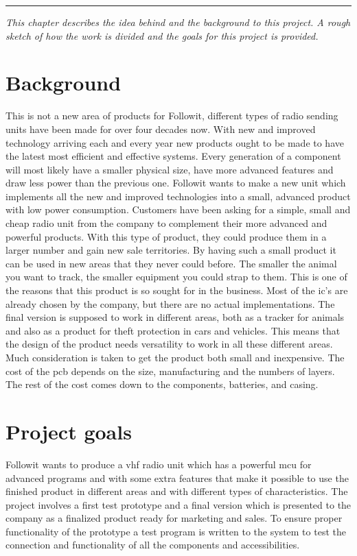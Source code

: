 
\vspace{-10ex}%
\rule{\textwidth}{0.3pt}
\vspace{5ex}

\textit{ 
This chapter describes the idea behind and the background to this project. A rough sketch of how the work is divided and the goals for this project is provided.
}
\vspace{5ex}

\section{Background}	%
This is not a new area of products for Followit, different types of radio sending units have been made for over four decades now. 
With new and improved technology arriving each and every year new products ought to be made to have the latest most efficient and effective systems. Every generation of a component will most likely have a smaller physical size, have more advanced features and draw less power than the previous one. Followit wants to make a new unit which implements all the new and improved technologies into a small, advanced product with low power consumption. 
Customers have been asking for a simple, small and cheap radio unit from the company to complement their more advanced and powerful products. With this type of product, they could produce them in a larger number and gain new sale territories. By having such a small product it can be used in new areas that they never could before. The smaller the animal you want to track, the smaller equipment you could strap to them. This is one of the reasons that this product is so sought for in the business. 
\newline 
Most of the \gls{ic}'s are already chosen by the company, but there are no actual implementations. The final version is supposed to work in different areas, both as a tracker for animals and also as a product for theft protection in cars and vehicles. This means that the design of the product needs versatility to work in all these different areas.  
Much consideration is taken to get the product both small and inexpensive. The cost of the \gls{pcb} depends on the size, manufacturing and the numbers of layers. The rest of the cost comes down to the components, batteries, and casing.    \\


\section{Project goals}	%
Followit wants to produce a \gls{vhf} radio unit which has a powerful \gls{mcu} for advanced programs and with some extra features that make it possible to use the finished product in different areas and with different types of characteristics. The project involves a first test prototype and a final version which is presented to the company as a finalized product ready for marketing and sales. To ensure proper functionality of the prototype a test program is written to the system to test the connection and functionality of all the components and accessibilities. 

